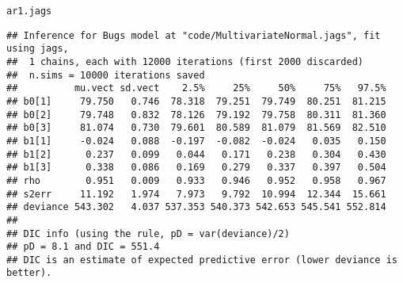 \documentclass[12pt,letterpaper,oneside]{article}\usepackage{graphicx, color}
\makeatletter
\newenvironment{kframe}{%
 \def\at@end@of@kframe{}%
 \ifinner\ifhmode%
  \def\at@end@of@kframe{\end{minipage}}%
  \begin{minipage}{\columnwidth}%
 \fi\fi%
 \def\FrameCommand##1{\hskip\@totalleftmargin \hskip-\fboxsep
 \colorbox{shadecolor}{##1}\hskip-\fboxsep
     \hskip-\linewidth \hskip-\@totalleftmargin \hskip\columnwidth}%
 \MakeFramed {\advance\hsize-\width
   \@totalleftmargin\z@ \linewidth\hsize
   \@setminipage}}%
 {\par\unskip\endMakeFramed%
 \at@end@of@kframe}
\newenvironment{knitrout}{}{} %
\makeatother
\begin{document}
\begin{knitrout}\scriptsize
{}\color{fgcolor}\begin{kframe}
\begin{alltt}
ar1.jags
\end{alltt}
\begin{verbatim}
## Inference for Bugs model at "code/MultivariateNormal.jags", fit using jags,
##  1 chains, each with 12000 iterations (first 2000 discarded)
##  n.sims = 10000 iterations saved
##          mu.vect sd.vect    2.5%     25%     50%     75%   97.5%
## b0[1]     79.750   0.746  78.318  79.251  79.749  80.251  81.215
## b0[2]     79.748   0.832  78.126  79.192  79.758  80.311  81.360
## b0[3]     81.074   0.730  79.601  80.589  81.079  81.569  82.510
## b1[1]     -0.024   0.088  -0.197  -0.082  -0.024   0.035   0.150
## b1[2]      0.237   0.099   0.044   0.171   0.238   0.304   0.430
## b1[3]      0.338   0.086   0.169   0.279   0.337   0.397   0.504
## rho        0.951   0.009   0.933   0.946   0.952   0.958   0.967
## s2err     11.192   1.974   7.973   9.792  10.994  12.344  15.661
## deviance 543.302   4.037 537.353 540.373 542.653 545.541 552.814
## 
## DIC info (using the rule, pD = var(deviance)/2)
## pD = 8.1 and DIC = 551.4
## DIC is an estimate of expected predictive error (lower deviance is better).
\end{verbatim}
\end{kframe}
\end{knitrout}

\end{document}
